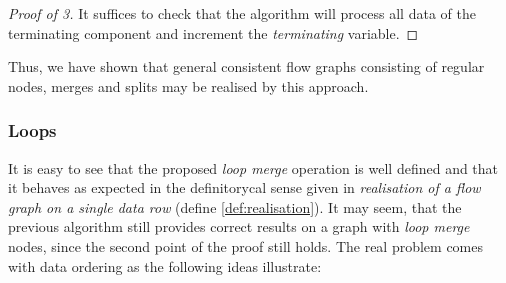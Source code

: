 \begin{proof}[Proof of 3]
It suffices to check that the algorithm will process all data of the terminating component and increment the \emph{terminating} variable.
\end{proof}
\myendclaim

Thus, we have shown that general consistent flow graphs consisting of regular nodes, merges and splits may be realised by this approach.

\subsubsection{Loops}

It is easy to see that the proposed \emph{loop merge} operation is well defined and that it behaves as expected in the definitorycal sense given in \emph{realisation of a flow graph on a single data row} (define \ref{def:realisation}). It may seem, that the previous algorithm still provides correct results on a graph with \emph{loop merge} nodes, since the second point of the proof still holds. The real problem comes with data ordering as the following ideas illustrate:
